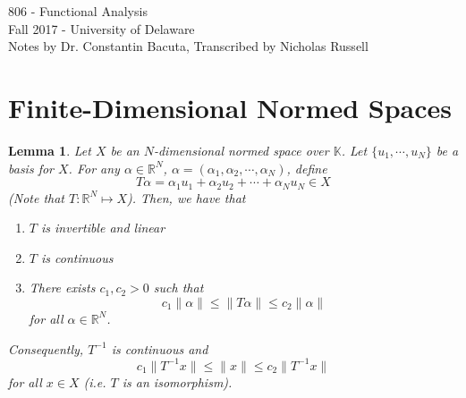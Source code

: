 \documentclass[oneside]{book}
\newtheorem{lemma}{Lemma}
\newcommand{\R}{{\mathbb R}}
\def\K{\mathbb{K}}
\begin{document}
\pagestyle{myheadings}


{\bf \large
\begin{center}
806 - Functional Analysis \\
Fall 2017 - University of Delaware \\
Notes by Dr. Constantin Bacuta, Transcribed by Nicholas Russell
\end{center}
}
%

\noindent

\section*{Finite-Dimensional Normed Spaces}
\setcounter{equation}{0}
\begin{lemma}
Let $X$ be an $N$-dimensional normed space over $\K$. Let $\{ u_1, \cdots, u_N\}$ be a basis for $X$. For any $\alpha \in \R^N$, $\alpha = (\alpha_1, \alpha_2, \cdots, \alpha_N)$, define 
\[ T\alpha = \alpha_1 u_1 + \alpha_2 u_2 + \cdots + \alpha_N u_N \in X  \]
(Note that $T: \R^N \mapsto X$). Then, we have that 
\begin{enumerate}
\item $T$ is invertible and linear
\item $T$ is continuous
\item There exists $c_1, c_2 > 0$ such that 
\begin{equation}
c_1 \| \alpha \| \leq \| T \alpha \| \leq c_2 \| \alpha \|
\end{equation} 
for all $\alpha \in \R^N$.
\end{enumerate}
Consequently, $T^{-1}$ is continuous and 
\begin{equation}
c_1 \| T^{-1}x \| \leq \| x \| \leq c_2 \| T^{-1}x \| 
\end{equation}
for all $x \in X$ (i.e. $T$ is an isomorphism).
\end{lemma}
\end{document}
